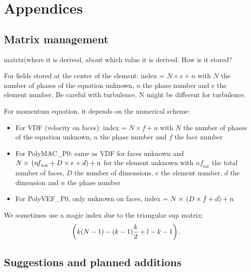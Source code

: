 
\chapter{Appendices}

\section{Matrix management}
matrix(where it is derived, about which value it is derived. How is it stored?

For fields stored at the center of the element: index = $N\times{}e + n$ with $N$ the number of phases of the equation unknown, $n$ the phase number and $e$ the element number. Be careful with turbulence, N might be different for turbulence.

For momentum equation, it depends on the numerical scheme:
\begin{itemize}
\item[\small \textcolor{blue}{\ding{109}}]For VDF (velocity on faces): index = $N\times{}f + n$ with $N$ the number of phases of the equation unknown, $n$ the phase number and $f$ the face number
\item[\small \textcolor{blue}{\ding{109}}]For PolyMAC\_P0: same as VDF for faces unknown and $N\times{}\left( \mathit{nf}_{\text{tot}} + D\times{}e + d \right) + n$ for the element unknown with $\mathit{nf}_{\text{tot}}$ the total number of faces, $D$ the number of dimensions, $e$ the element number, $d$ the dimension and $n$ the phase number
\item[\small \textcolor{blue}{\ding{109}}]For PolyVEF\_P0, only unknown on faces, index = $N\times{}\left( D\times{}f + d \right) + n$
\end{itemize}

We sometimes use a magic index due to the triangular sup matrix:
\begin{equation}
    \left( k(N-1) - (k-1)\frac{k}{2} + l-k-1 \right).
\end{equation}

\section{Suggestions and planned additions}
